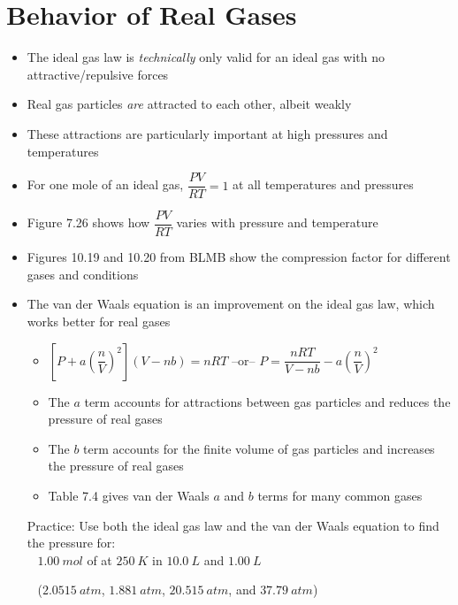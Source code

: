 \documentclass[12pt, openany, letterpaper]{memoir}
\begin{document}
\section{Behavior of Real Gases}
\begin{itemize}
	\item The ideal gas law is \emph{technically} only valid for an ideal gas with no attractive/repulsive forces
	\item Real gas particles \emph{are} attracted to each other, albeit weakly
	\item These attractions are particularly important at high pressures and temperatures
	\item For one mole of an ideal gas, $\dfrac{PV}{RT}=1$ at all temperatures and pressures
	\item Figure 7.26 shows how $\dfrac{PV}{RT}$ varies with pressure and temperature
	\item Figures 10.19 and 10.20 from BLMB show the compression factor for different gases and conditions
	\item The van der Waals equation is an improvement on the ideal gas law, which works better for real gases
	\begin{itemize}
		\item $\left[P+a\left(\dfrac{n}{V}\right)^2\right]\left(V-nb\right)=nRT$ \hspace{1em} --or-- \hspace{1em} $P=\dfrac{nRT}{V-nb}-a\left(\dfrac{n}{V}\right)^2$
		\item The $a$ term accounts for attractions between gas particles and reduces the pressure of real gases
		\item The $b$ term accounts for the finite volume of gas particles and increases the pressure of real gases
		\item Table 7.4 gives van der Waals $a$ and $b$ terms for many common gases
	\end{itemize}
	Practice: Use both the ideal gas law and the van der Waals equation to find the pressure for:\\
	~\hphantom{Practice: } $1.00~mol$ of  at $250~K$ in $10.0~L$ and $1.00~L$
	
	~\hphantom{Practice: } ($2.0515~atm$, $1.881~atm$, $20.515~atm$, and $37.79~atm$)
\end{itemize}

\backmatter
\end{document}
